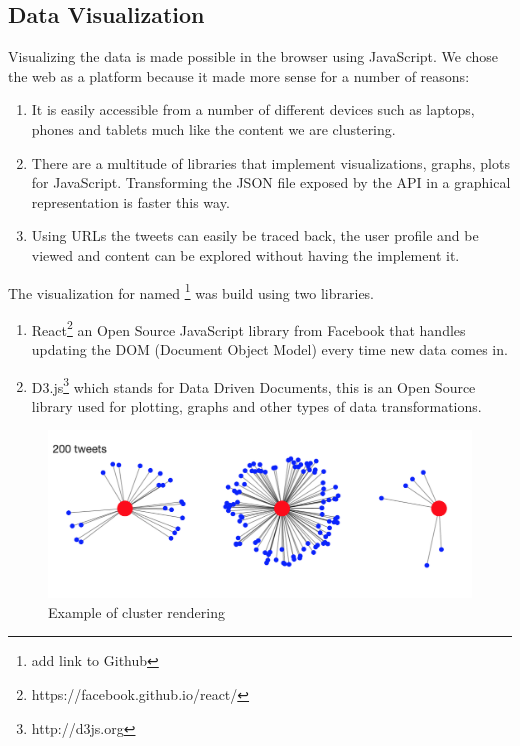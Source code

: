 \subsection{Data Visualization}
\label{datavisualization}

Visualizing the data is made possible in the browser using JavaScript. We chose the web as a platform because it made more sense for a number of reasons:
\begin{enumerate}
	\item It is easily accessible from a number of different devices such as laptops, phones and tablets much like the content we are clustering.
	\item There are a multitude of libraries that implement visualizations, graphs, plots for JavaScript. Transforming the JSON file exposed by the API in a graphical representation is faster this way.
	\item Using URLs the tweets can easily be traced back, the user profile and be viewed and content can be explored without having the implement it.
\end{enumerate}
The visualization for {\project} named \textbf{\frontend}\footnote{add link to Github} was build using two libraries.
\begin{enumerate}
	\item React\footnote{https://facebook.github.io/react/} an Open Source JavaScript library from Facebook that handles updating the DOM (Document Object Model) every time new data comes in.
	\item D3.js\footnote{http://d3js.org} which stands for Data Driven Documents, this is an Open Source library used for plotting, graphs and other types of data transformations.
\end{enumerate}

\begin{figure}[ht!]
\centering
\includegraphics[width=\textwidth,height=\textheight,keepaspectratio]{src/img/clusters.png}
\caption{Example of cluster rendering\label{overflow}}
\end{figure}

